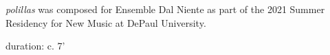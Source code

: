 \documentclass[11pt]{article}
\begin{document}
\vspace*{13\baselineskip}

\begin{center}
\textit{polillas} was composed for Ensemble Dal Niente as part of the 2021 Summer Residency for New Music at DePaul University.
\rightskip\leftskip
\phantom{text} \hfill \phantom{()}
\end{center}

\vspace*{26\baselineskip}

\begin{center}
duration: c. 7'
\end{center}
\end{document}
